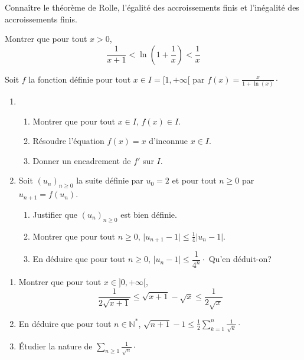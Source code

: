\documentclass[a4paper,twoside,french,10pt]{VcCours}
\begin{document}
\begin{ptc}{}
	Connaître le théorème de Rolle, l'égalité des accroissements finis et l'inégalité des accroissements finis.
\end{ptc}

\medskip

\begin{Exercice}{}\end{Exercice} Montrer que pour tout $x>0$,
$$ \dfrac{1}{x+1} < \ln \left( 1 + \dfrac{1}{x} \right) < \dfrac{1}{x}$$

\newpage

\begin{Exercice}{}\end{Exercice} Soit $f$ la fonction définie pour tout $x \in I=[1, + \infty[$ par $f(x) = \frac{x}{1+\ln(x)} \cdot$

\begin{enumerate}
\item
\begin{enumerate}
\item Montrer que pour tout $x \in I$, $f(x) \in I$.
\item Résoudre l'équation $f(x)=x$ d'inconnue $x \in I$.
\item Donner un encadrement de $f'$ sur $I$.
\end{enumerate}
\item Soit $(u_n)_{n \geq 0}$ la suite définie par $u_0=2$ et pour tout $n \geq 0$ par $u_{n+1}=f(u_n)$.
\begin{enumerate}
\item Justifier que $(u_n)_{n \geq 0}$ est bien définie.
\item Montrer que pour tout $n\geq 0$, $\vert u_{n+1} - 1 \vert \leq \frac{1}{4} \vert u_n - 1 \vert$.
\item En déduire que pour tout $n \geq 0$, $\vert u_n - 1 \vert \leq \dfrac{1}{4^n}\cdot$ Qu'en déduit-on?
\end{enumerate}
\end{enumerate}

\medskip

\begin{Exercice}{}\end{Exercice} 
\begin{enumerate}
\item Montrer que pour tout $x \in ]0, + \infty[$,
\[ \frac{1}{2\sqrt{x+1}} \leq \sqrt{x+1} - \sqrt{x} \leq \frac{1}{2\sqrt{x}} \]
\item En déduire que pour tout $n \in \mathbb{N}^*$, $\sqrt{n+1} - 1 \leq \frac{1}{2} \sum_{k=1}^n \frac{1}{\sqrt{k}} \cdot$
\item Étudier la nature de $\sum_{n \geq 1} \frac{1}{\sqrt{n}} \cdot$
\end{enumerate}
\end{document}
